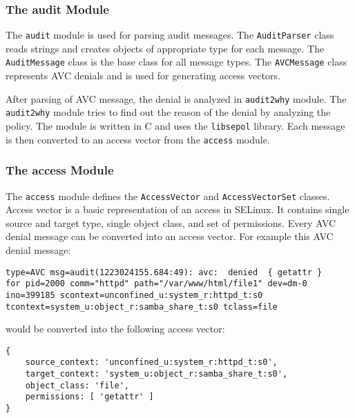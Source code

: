 \subsubsection{The audit Module}

The \texttt{audit} module is used for parsing audit messages. The
\texttt{AuditParser} class reads strings and creates objects of appropriate type
for each message. The \texttt{AuditMessage} class is the base class for all
message types. The \texttt{AVCMessage} class represents AVC denials and is used
for generating access vectors.

After parsing of AVC message, the denial is analyzed in \texttt{audit2why}
module. The \texttt{audit2why} module tries to find out the reason of the denial
by analyzing the policy. The module is written in C and uses the
\texttt{libsepol} library. Each message is then converted to an access vector
from the \texttt{access} module.

\subsubsection{The access Module}

The \texttt{access} module defines the \texttt{AccessVector} and
\texttt{AccessVectorSet} classes. Access vector is a basic representation of an
access in SELinux. It contains single source and target type, single object
class, and set of permissions. Every AVC denial message can be converted into an
access vector. For example this AVC denial message:
\begin{lstlisting}
type=AVC msg=audit(1223024155.684:49): avc:  denied  { getattr }
for pid=2000 comm="httpd" path="/var/www/html/file1" dev=dm-0
ino=399185 scontext=unconfined_u:system_r:httpd_t:s0
tcontext=system_u:object_r:samba_share_t:s0 tclass=file
\end{lstlisting}
would be converted into the following access vector:
\begin{lstlisting}
{
    source_context: 'unconfined_u:system_r:httpd_t:s0',
    target_context: 'system_u:object_r:samba_share_t:s0',
    object_class: 'file',
    permissions: [ 'getattr' ]
}
\end{lstlisting}

